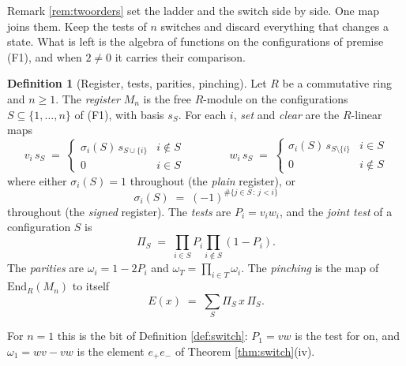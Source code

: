 \documentclass[11pt]{article}
\theoremstyle{plain}
\theoremstyle{definition}
\theoremstyle{plain}
\theoremstyle{definition}
\newtheorem{definition}[theorem]{Definition}
\begin{document}
Remark \ref{rem:twoorders} set the ladder and the switch side by side. One map joins them. Keep the tests of $n$ switches and discard everything that changes a state. What is left is the algebra of functions on the configurations of premise (F1), and when $2 \neq 0$ it carries their comparison.

\begin{definition}[Register, tests, parities, pinching]\label{def:register}
Let $R$ be a commutative ring and $n \geq 1$. The \emph{register} $M_{n}$ is the free $R$-module on the configurations $S \subseteq \{1, \dots, n\}$ of (F1), with basis $s_{S}$. For each $i$, \emph{set} and \emph{clear} are the $R$-linear maps
\[
v_{i}\,s_{S} \;=\;
\begin{cases}
\sigma_{i}(S)\,s_{S \cup \{i\}} & i \notin S \\
0 & i \in S
\end{cases}
\qquad\qquad
w_{i}\,s_{S} \;=\;
\begin{cases}
\sigma_{i}(S)\,s_{S \setminus \{i\}} & i \in S \\
0 & i \notin S
\end{cases}
\]
where either $\sigma_{i}(S) = 1$ throughout (the \emph{plain} register), or
\[
\sigma_{i}(S) \;=\; (-1)^{\#\{j \in S \,:\, j < i\}}
\]
throughout (the \emph{signed} register). The \emph{tests} are $P_{i} = v_{i}w_{i}$, and the \emph{joint test} of a configuration $S$ is
\[
\Pi_{S} \;=\; \prod_{i \in S} P_{i} \prod_{i \notin S} (1 - P_{i}) .
\]
The \emph{parities} are $\omega_{i} = 1 - 2P_{i}$ and $\omega_{T} = \prod_{i \in T}\omega_{i}$. The \emph{pinching} is the map of $\mathrm{End}_{R}(M_{n})$ to itself
\[
E(x) \;=\; \sum_{S} \Pi_{S}\,x\,\Pi_{S} .
\]
\end{definition}

For $n = 1$ this is the bit of Definition \ref{def:switch}: $P_{1} = vw$ is the test for on, and $\omega_{1} = wv - vw$ is the element $e_{+}e_{-}$ of Theorem \ref{thm:switch}(iv).
\end{document}
